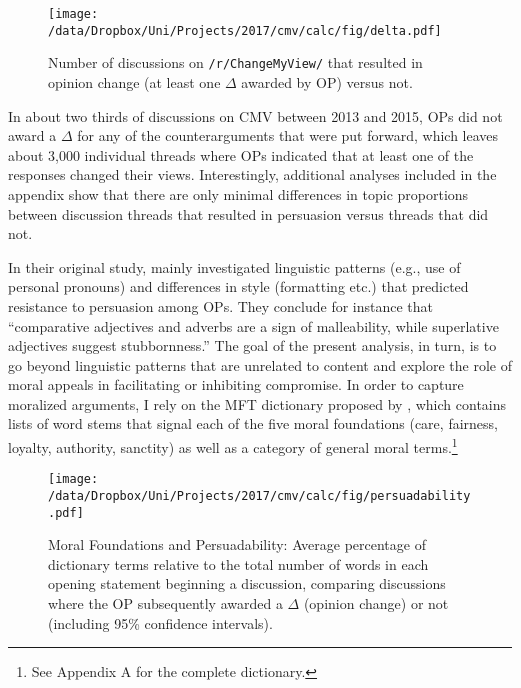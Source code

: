 \begin{figure}[ht]
\centering
\texttt{[image: /data/Dropbox/Uni/Projects/2017/cmv/calc/fig/delta.pdf]}
\caption[Number of original posts on \texttt{/r/ChangeMyView/} that resulted in opinion change]{Number of discussions on \texttt{/r/ChangeMyView/} that resulted in opinion change (at least one $\Delta$ awarded by OP) versus not.}\label{fig:delta}
\end{figure}

In about two thirds of discussions on CMV between 2013 and 2015, OPs did not award a $\Delta$ for any of the counterarguments that were put forward, which leaves about 3,000 individual threads where OPs indicated that at least one of the responses changed their views. Interestingly, additional analyses included in the appendix show that there are only minimal differences in topic proportions between discussion threads that resulted in persuasion versus threads that did not.

In their original study, \citet{tan2016winning} mainly investigated linguistic patterns (e.g., use of personal pronouns) and differences in style (formatting etc.) that predicted resistance to persuasion among OPs. They conclude for instance that ``comparative adjectives and adverbs are a sign of malleability, while superlative adjectives suggest stubbornness.'' The goal of the present analysis, in turn, is to go beyond linguistic patterns that are unrelated to content and explore the role of moral appeals in facilitating or inhibiting compromise. In order to capture moralized arguments, I rely on the MFT dictionary proposed by \citet{graham2009liberals}, which contains lists of word stems that signal each of the five moral foundations (care, fairness, loyalty, authority, sanctity) as well as a category of general moral terms.\footnote{See Appendix A for the complete dictionary.}

\begin{figure}[ht]
\centering
\texttt{[image: /data/Dropbox/Uni/Projects/2017/cmv/calc/fig/persuadability.pdf]}
\caption[Moral Foundations and Persuadability]{Moral Foundations and Persuadability: Average percentage of dictionary terms relative to the total number of words in each opening statement beginning a discussion, comparing discussions where the OP subsequently awarded a $\Delta$ (opinion change) or not (including 95\% confidence intervals).}\label{fig:persuadability}
\end{figure}

